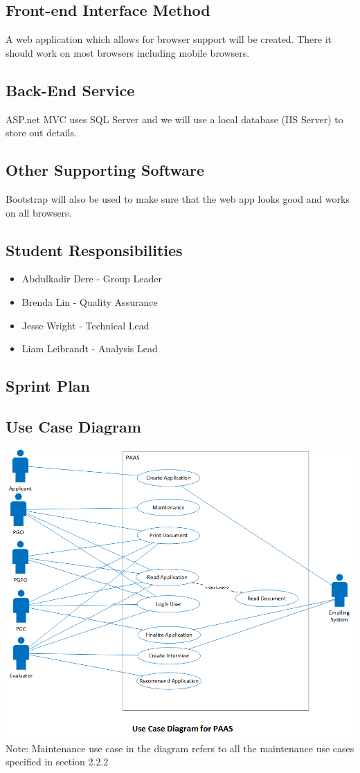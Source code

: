 \documentclass{article}
\begin{document}
\subsection{Front-end Interface Method}
A web application which allows for browser support will be created. There it should work on most browsers including mobile browsers.
\subsection{Back-End Service}
ASP.net MVC uses SQL Server and we will use a local database (IIS Server) to store out details.
\subsection{Other Supporting Software}
Bootstrap will also be used to make sure that the web app looks good and works on all browsers. \\
\subsection{Student Responsibilities}
\begin{itemize}
\item Abdulkadir Dere - Group Leader
\item Brenda Lin - Quality Assurance
\item Jesse Wright - Technical Lead
\item Liam Leibrandt - Analysis Lead
\end{itemize}
\subsection{Sprint Plan}
\subsection{Use Case Diagram}
\includegraphics[scale=0.65]{UseCaseDiagram.png} \\
Note: Maintenance use case in the diagram refers to all the maintenance use cases specified in section 2.2.2
\end{document}
